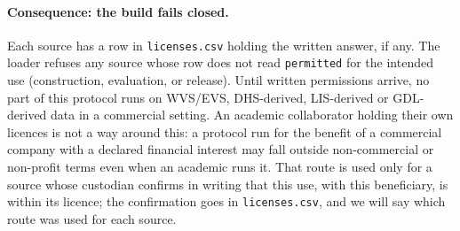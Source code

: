 \documentclass[10pt]{article}
\begin{document}
\paragraph{Consequence: the build fails closed.} Each source has a row in \nolinkurl{licenses.csv} holding the written answer, if any. The loader refuses any source whose row does not read \texttt{permitted} for the intended use (construction, evaluation, or release). Until written permissions arrive, no part of this protocol runs on WVS/EVS, DHS-derived, LIS-derived or GDL-derived data in a commercial setting. An academic collaborator holding their own licences is not a way around this: a protocol run for the benefit of a commercial company with a declared financial interest may fall outside non-commercial or non-profit terms even when an academic runs it. That route is used only for a source whose custodian confirms in writing that this use, with this beneficiary, is within its licence; the confirmation goes in \nolinkurl{licenses.csv}, and we will say which route was used for each source.
\end{document}
